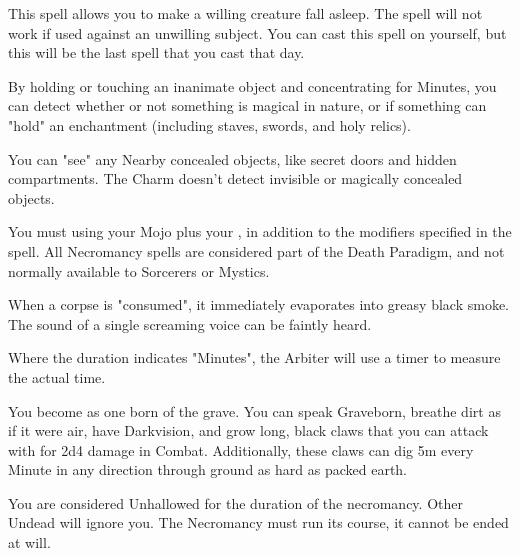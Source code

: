 {

This spell allows you to make a willing creature fall asleep. The spell will not work if used against an unwilling subject. You can cast this spell on yourself, but this will be the last spell that you cast that day.


By holding or touching an inanimate object and concentrating for Minutes, you can detect whether or not something is magical in nature, or if something can "hold" an enchantment (including staves, swords, and holy relics).  


You can "see" any Nearby concealed objects, like secret doors and hidden compartments.  The Charm doesn't detect invisible or magically concealed objects. 



You must \RO using your Mojo \UD plus your \FOC, in addition to the modifiers specified in the spell.  All Necromancy spells are considered part of the Death Paradigm, and not normally available to Sorcerers or Mystics.




When a corpse is "consumed", it immediately evaporates into greasy black smoke.  The sound of a single screaming voice can be faintly heard.

Where the duration indicates "\LVL Minutes", the Arbiter will use a timer to measure the actual time.


\NECRO[
  Name=Born of the Grave,
  Link=necromancy-born-of-the-grave,
  Paradigm=Death,
  Save=N,
  Duration=Combat or \LVL Minutes,
  Mod=+3,
  Keywords=None,
  Target=Self
]


You become as one born of the grave.  You can speak Graveborn, breathe dirt as if it were air, have Darkvision, and grow long, black claws that you can attack with for 2d4 damage in Combat.  Additionally, these claws can dig 5m every Minute in any direction through ground as hard as packed earth.  

You are considered Unhallowed for the duration of the necromancy.  Other Undead will ignore you.  The Necromancy must run its course, it cannot be ended at will.

}
